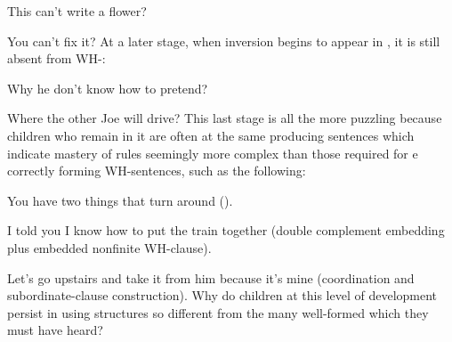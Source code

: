 \ea\label{ex:3:51}
 This can't write a flower? 
\z

\ea\label{ex:3:52}
 You can't fix it? 
\z
At a later stage, when inversion begins to appear in  , it is still absent from WH-:

\ea\label{ex:3:53}
 Why he don't know how to pretend? 
\z

\ea\label{ex:3:54}
 Where the other Joe will drive? 
\z
This last stage is all the more puzzling because children who remain in it are often at the same  producing sentences which indicate mastery of rules seemingly more complex than those required for e correctly forming  WH-sentences, such as the following:

\ea\label{ex:3:55}
 You have two things that turn around (). 
\z

\ea\label{ex:3:56}
 I told you I know how to put the train together (double complement embedding plus embedded nonfinite WH-clause). 
\z

\ea\label{ex:3:57}
 Let's go upstairs and take it from him because it's mine (coordination and subordinate-clause  construction). 
\z
Why do children at this level of development persist in using structures so different from the many well-formed  which they must have heard?

